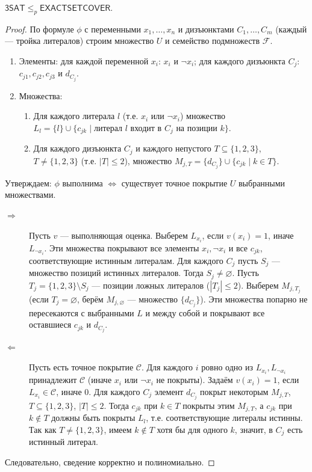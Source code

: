 \begin{proposition}
    $\mathsf{3SAT} \le_p \mathsf{EXACTSETCOVER}$.
\end{proposition}
\begin{proof}
    По формуле $\phi$ с переменными $x_1,\dots,x_n$ и дизъюнктами $C_1,\dots,C_m$ (каждый — тройка литералов) строим множество $U$ и семейство подмножеств $\mathcal{F}$.
    \begin{enumerate}
        \item Элементы: для каждой переменной $x_i$: $x_i$ и $\neg x_i$; для каждого дизъюнкта $C_j$: $c_{j1},c_{j2},c_{j3}$ и $d_{C_j}$.
        \item Множества:
        \begin{enumerate}
            \item Для каждого литерала $l$ (т.е. $x_i$ или $\neg x_i$) множество $L_l = \{l\} \cup \{c_{jk}\mid \text{литерал }l\text{ входит в }C_j\text{ на позиции }k\}$.
            \item Для каждого дизъюнкта $C_j$ и каждого непустого $T\subseteq\{1,2,3\}$, $T\ne\{1,2,3\}$ (т.е. $|T|\le2$), множество $M_{j,T} = \{d_{C_j}\} \cup \{c_{jk}\mid k\in T\}$.
        \end{enumerate}
    \end{enumerate}
    Утверждаем: $\phi$ выполнима $\iff$ существует точное покрытие $U$ выбранными множествами.
    \begin{description}
        \item[$\Rightarrow$] Пусть $v$ — выполняющая оценка. Выберем $L_{x_i}$, если $v(x_i)=1$, иначе $L_{\neg x_i}$. Эти множества покрывают все элементы $x_i,\neg x_i$ и все $c_{jk}$, соответствующие истинным литералам. Для каждого $C_j$ пусть $S_j$ — множество позиций истинных литералов. Тогда $S_j\neq\varnothing$. Пусть $T_j=\{1,2,3\}\setminus S_j$ — позиции ложных литералов ($|T_j|\le2$). Выберем $M_{j,T_j}$ (если $T_j=\varnothing$, берём $M_{j,\varnothing}$ — множество $\{d_{C_j}\}$). Эти множества попарно не пересекаются с выбранными $L$ и между собой и покрывают все оставшиеся $c_{jk}$ и $d_{C_j}$.
        \item[$\Leftarrow$] Пусть есть точное покрытие $\mathcal{C}$. Для каждого $i$ ровно одно из $L_{x_i},L_{\neg x_i}$ принадлежит $\mathcal{C}$ (иначе $x_i$ или $\neg x_i$ не покрыты). Задаём $v(x_i)=1$, если $L_{x_i}\in\mathcal{C}$, иначе 0. Для каждого $C_j$ элемент $d_{C_j}$ покрыт некоторым $M_{j,T}$, $T\subseteq\{1,2,3\}$, $|T|\le2$. Тогда $c_{jk}$ при $k\in T$ покрыты этим $M_{j,T}$, а $c_{jk}$ при $k\notin T$ должны быть покрыты $L_l$, т.е. соответствующие литералы истинны. Так как $T\neq\{1,2,3\}$, имеем $k\notin T$ хотя бы для одного $k$, значит, в $C_j$ есть истинный литерал.
    \end{description}
    Следовательно, сведение корректно и полиномиально.
\end{proof}

